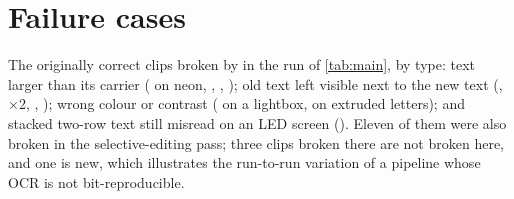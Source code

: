 \section{Failure cases}
\label{sec:supp_fail}
The \rOursBroken{} originally correct clips broken by \method in the run of \cref{tab:main}, by type: text larger than its carrier ( on neon, , , ); old text left visible next to the new text (,  $\times$2, , ); wrong colour or contrast ( on a lightbox,  on extruded letters); and stacked two-row text still misread on an LED screen (). Eleven of them were also broken in the selective-editing pass; three clips broken there are not broken here, and one is new, which illustrates the run-to-run variation of a pipeline whose OCR is not bit-reproducible.
